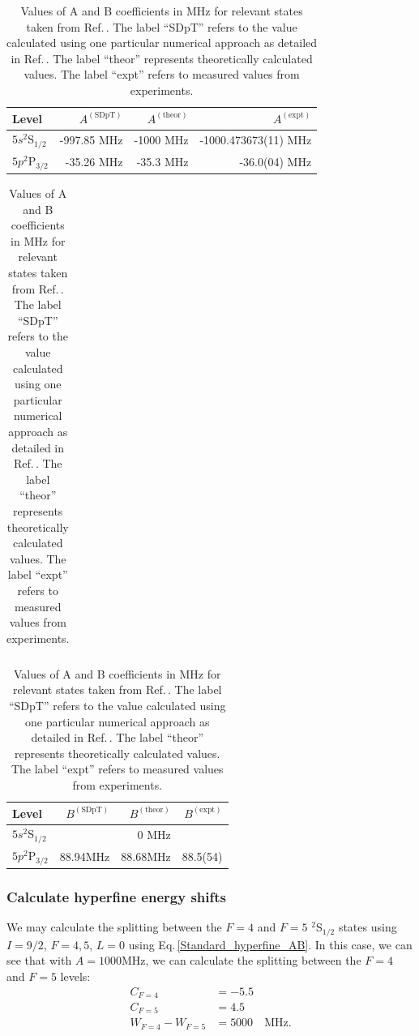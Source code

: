 \begin{table}[h]
\centering
\begin{tabular}{|l|r|r|r|}
\hline
Level &  $A^{\mathrm{(SDpT)}}$ &$A^{\mathrm{(theor)}}$ & $A^{\mathrm{(expt)}}$ \\ \hline \hline
$5s ^2$S$_{1/2}$&-997.85 MHz& -1000 MHz& -1000.473673(11) MHz\\ \hline
$5p ^2$P$_{3/2}$&-35.26 MHz&-35.3 MHz&-36.0(04) MHz\\ \hline
\end{tabular}

\begin{tabular}{l}
\end{tabular}

\begin{tabular}{|l|r|r|r|}
\hline
Level &  $B^{\mathrm{(SDpT)}}$ &$B^{\mathrm{(theor)}}$ & $B^{\mathrm{(expt)}}$ \\ \hline \hline
$5s ^2$S$_{1/2}$&&0  MHz&  \\ \hline
$5p ^2$P$_{3/2}$&88.94MHz&$88.68$MHz\footnotemark&88.5(54) \\ \hline
\end{tabular}
\caption{Values of A and B coefficients in MHz for relevant states taken from Ref.\,\cite{safronova2photon}. The label ``SDpT'' refers to the value calculated using one particular numerical approach as detailed in Ref.\,\cite{safronova2photon}. The label ``theor'' represents theoretically calculated values. The label ``expt'' refers to measured values from experiments.\label{AB_table}
}
\end{table}

\subsubsection{Calculate hyperfine energy shifts}
We may calculate the splitting between the $F=4$ and $F=5$ $^2$S$_{1/2}$ states using $I=9/2$, $F=4,5$, $L=0$ using Eq.\,\ref{Standard_hyperfine_AB}. In this case, we can see that with $A=1000$MHz, we can calculate the splitting between the $F=4$ and $F=5$ levels: 
\begin{align}
C_{F=4} &= -5.5\\
C_{F=5} &= 4.5\\
W_{F=4}-W_{F=5}&=5000 \quad \mathrm{MHz}.
\end{align}

